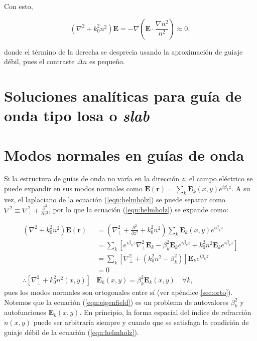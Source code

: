 Con esto, 

\begin{equation}
	(\nabla^2  + k_0^2n^2)\textbf{E} = -\nabla\left(\textbf{E} \cdot \frac{\nabla n^2}{n^2}\right) \approx 0, \label{eqn:helmholz}
\end{equation}

donde el término de la derecha se desprecia usando la aproximación de guiaje débil, pues el contraste $\Delta n$ es pequeño. 

\section{Soluciones analíticas para guía de onda tipo losa o \textit{slab}}




\section{Modos normales en guías de onda}

Si la estructura de guías de onda no varía en la dirección $z$, el campo eléctrico se puede expandir en sus modos normales como $\textbf{E}(\textbf{r}) = \sum_k \textbf{E}_k(x, y) e^{i\beta_k z}$. A su vez, el laplaciano de la ecuación (\ref{eqn:helmholz}) se puede separar como $\nabla^2 \equiv \nabla_\perp^2 + \frac{\partial^2}{\partial z^2}$, por lo que la ecuación (\ref{eqn:helmholz}) se expande como:

\begin{align}
	(\nabla^2  + k_0^2n^2) \textbf{E}(\textbf{r}) &= \left(\nabla_\perp^2 + \frac{\partial^2}{\partial z^2} + k_0^2n^2\right)\sum_k \textbf{E}_k(x, y)  e^{i\beta_k z} \nonumber
\\	
	&= \sum_k \left[ e^{i\beta_k z} \nabla_\perp^2 \textbf{E}_k -\beta_k^2\textbf{E}_k e^{i\beta_k z} + k_0^2n^2 \textbf{E}_k  e^{i\beta_k z}\right]
\nonumber	
	\\	
	&= \sum_k \left[  \nabla_\perp^2  + (k_0^2n^2-\beta_k^2) \right]\textbf{E}_k  e^{i\beta_k z}
	\nonumber	
	\\
	&=
	0
	\nonumber
	\\
	\therefore
	 \left[  \nabla_\perp^2  + k_0^2n^2(x,y) \right]&\textbf{E}_k(x,y)  = \beta_k^2 \textbf{E}_k(x,y) \quad \forall k, \label{eqn:eigenfield}
\end{align}
pues los modos normales son ortogonales entre sí (ver apéndice \ref{sec:orto}).
Notemos que la ecuación (\ref{eqn:eigenfield}) es un problema de autovalores $\beta_k^2$ y autofunciones $\textbf{E}_k(x,y)$. En principio, la forma espacial del índice de refracción $n(x, y)$ puede ser arbitraria siempre y cuando que se satisfaga la condición de guiaje débil de la ecuación (\ref{eqn:helmholz}). 

